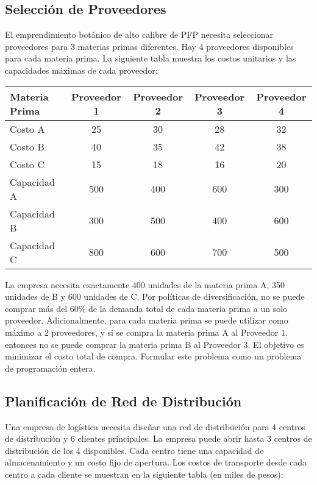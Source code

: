 \documentclass[12pt]{article}
\begin{document}
\subsection{Selección de Proveedores}
El emprendimiento botánico de alto calibre de PFP necesita seleccionar proveedores para 3 materias primas diferentes. Hay 4 proveedores disponibles para cada materia prima. La siguiente tabla muestra los costos unitarios y las capacidades máximas de cada proveedor:

\begin{table}[h]
\centering
\begin{tabular}{lcccc}
\toprule
\textbf{Materia Prima} & \textbf{Proveedor 1} & \textbf{Proveedor 2} & \textbf{Proveedor 3} & \textbf{Proveedor 4} \\
\midrule
Costo A & 25 & 30 & 28 & 32 \\
Costo B & 40 & 35 & 42 & 38 \\
Costo C & 15 & 18 & 16 & 20 \\
\midrule
Capacidad A & 500 & 400 & 600 & 300 \\
Capacidad B & 300 & 500 & 400 & 600 \\
Capacidad C & 800 & 600 & 700 & 500 \\
\bottomrule
\end{tabular}
\end{table}

La empresa necesita exactamente 400 unidades de la materia prima A, 350 unidades de B y 600 unidades de C. Por políticas de diversificación, no se puede comprar más del 60\% de la demanda total de cada materia prima a un solo proveedor. 
Adicionalmente, para cada materia prima se puede utilizar como máximo a 2 proveedores, y si se compra la materia prima A al Proveedor 1, entonces no se puede comprar la materia prima B al Proveedor 3. El objetivo es minimizar el costo total de compra. Formular este problema como un problema de programación entera.

\subsection{Planificación de Red de Distribución}
Una empresa de logística necesita diseñar una red de distribución para 4 centros de distribución y 6 clientes principales. La empresa puede abrir hasta 3 centros de distribución de los 4 disponibles. Cada centro tiene una capacidad de almacenamiento y un costo fijo de apertura. Los costos de transporte desde cada centro a cada cliente se muestran en la siguiente tabla (en miles de pesos):
\end{document}
